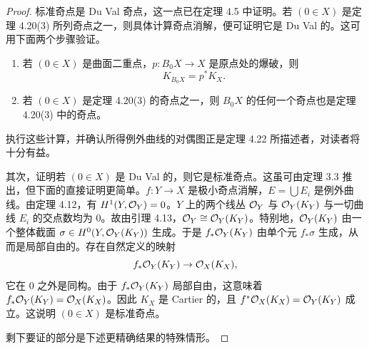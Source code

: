 \begin{proof}
标准奇点是 Du Val 奇点，这一点已在定理 4.5 中证明。若 $(0\in X)$ 是定理 4.20(3) 所列奇点之一，则具体计算奇点消解，便可证明它是 Du Val 的。这可用下面两个步骤验证。
\begin{enumerate}[label=(\arabic*),leftmargin=*]
\item 若 $(0\in X)$ 是曲面二重点，$p\colon B_0X\to X$ 是原点处的爆破，则
\[
K_{B_0X}=p^*K_X .
\]
\item 若 $(0\in X)$ 是定理 4.20(3) 的奇点之一，则 $B_0X$ 的任何一个奇点也是定理 4.20(3) 中的奇点。
\end{enumerate}
执行这些计算，并确认所得例外曲线的对偶图正是定理 4.22 所描述者，对读者将十分有益。

其次，证明若 $(0\in X)$ 是 Du Val 的，则它是标准奇点。这虽可由定理 3.3 推出，但下面的直接证明更简单。$f\colon Y\to X$ 是极小奇点消解，$E=\bigcup E_i$ 是例外曲线。由定理 4.12，有 $H^1(Y,\mathcal{O}_Y)=0$。$Y$ 上的两个线丛 $\mathcal{O}_Y$ 与 $\mathcal{O}_Y(K_Y)$ 与一切曲线 $E_i$ 的交点数均为 $0$。故由引理 4.13，$\mathcal{O}_Y\cong\mathcal{O}_Y(K_Y)$。特别地，$\mathcal{O}_Y(K_Y)$ 由一个整体截面 $\sigma\in H^0(Y,\mathcal{O}_Y(K_Y))$ 生成。于是 $f_*\mathcal{O}_Y(K_Y)$ 由单个元 $f_*\sigma$ 生成，从而是局部自由的。存在自然定义的映射
\[
f_*\mathcal{O}_Y(K_Y)\to\mathcal{O}_X(K_X),
\]
它在 $0$ 之外是同构。由于 $f_*\mathcal{O}_Y(K_Y)$ 局部自由，这意味着 $f_*\mathcal{O}_Y(K_Y)=\mathcal{O}_X(K_X)$。因此 $K_X$ 是 Cartier 的，且 $f^*\mathcal{O}_X(K_X)=\mathcal{O}_Y(K_Y)$ 成立。这说明 $(0\in X)$ 是标准奇点。

剩下要证的部分是下述更精确结果的特殊情形。
\end{proof}

